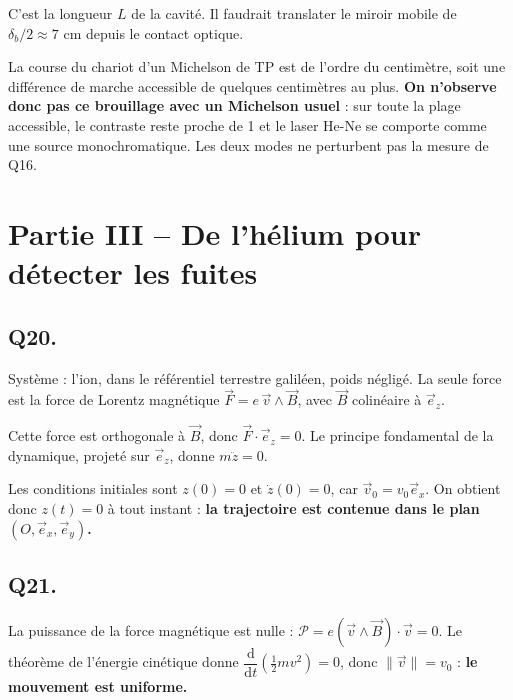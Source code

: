 \documentclass[11pt,a4paper]{article}
\newcommand{\equationajustee}[1]{%
  \sbox{\boiteequation}{$\displaystyle #1$}%
  \ifdim\wd\boiteequation>\linewidth
    \[\resizebox{\linewidth}{!}{\usebox{\boiteequation}}\]%
  \else
    \[#1\]%
  \fi}
\begin{document}
\equationajustee{\delta_b=\frac{3{,}0\cdot10^{8}}{2\times1{,}1\cdot10^{9}}\ \mathrm m\approx\boxed{0{,}14\ \mathrm m}}

C'est la longueur \(L\) de la cavité. Il faudrait translater le miroir mobile de \(\delta_b/2\approx7\) cm depuis le contact optique.

La course du chariot d'un Michelson de TP est de l'ordre du centimètre, soit une différence de marche accessible de quelques centimètres au plus. \textbf{On n'observe donc pas ce brouillage avec un Michelson usuel} : sur toute la plage accessible, le contraste reste proche de 1 et le laser He-Ne se comporte comme une source monochromatique. Les deux modes ne perturbent pas la mesure de Q16.

\hypertarget{partie-iii-de-lhuxe9lium-pour-duxe9tecter-les-fuites}{%
\section{Partie III -- De l'hélium pour détecter les fuites}\label{partie-iii-de-lhuxe9lium-pour-duxe9tecter-les-fuites}}

\hypertarget{q20.}{%
\subsection{Q20.}\label{q20.}}

Système : l'ion, dans le référentiel terrestre galiléen, poids négligé. La seule force est la force de Lorentz magnétique \(\vec F=e\,\vec v\wedge\vec B\), avec \(\vec B\) colinéaire à \(\vec e_z\).

Cette force est orthogonale à \(\vec B\), donc \(\vec F\cdot\vec e_z=0\). Le principe fondamental de la dynamique, projeté sur \(\vec e_z\), donne \(m\ddot z=0\).

Les conditions initiales sont \(z(0)=0\) et \(\dot z(0)=0\), car \(\vec v_0=v_0\vec e_x\). On obtient donc \(z(t)=0\) à tout instant : \textbf{la trajectoire est contenue dans le plan \((O,\vec e_x,\vec e_y)\).}

\hypertarget{q21.}{%
\subsection{Q21.}\label{q21.}}

La puissance de la force magnétique est nulle : \(\mathcal P=e(\vec v\wedge\vec B)\cdot\vec v=0\). Le théorème de l'énergie cinétique donne \(\dfrac{\mathrm d}{\mathrm dt}\left(\frac12mv^2\right)=0\), donc \(\|\vec v\|=v_0\) : \textbf{le mouvement est uniforme.}
\end{document}
